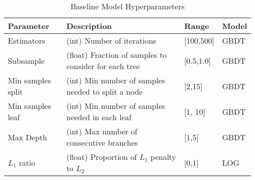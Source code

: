 \documentclass[11pt]{article}
\begin{document}
            \begin{table*}[ht]
            \caption{Baseline Model Hyperparameters} \label{tab:Baseline Model Hyperparameters} 
            \centering
            \begin{tabular}{|| m{3cm} | m{8.75cm}| m{2cm} | m{1.25cm} |}
                \hline
                \textbf{Parameter} & \textbf{Description} & \textbf{Range} & \textbf{Model} \\
                \hline\hline
                Estimators & (int) Number of iterations  & [100,500] & GBDT \\
                \hline
                Subsample & (float) Fraction of samples to consider for each tree & [0.5,1.0] & GBDT \\
                \hline
                Min samples split & (int) Min number of samples needed to split a node & [2,15] & GBDT \\
                \hline
                Min samples leaf & (int) Min number of samples needed in each leaf & [1, 10] & GBDT \\
                \hline
                Max Depth & (int) Max number of consecutive branches & [1,5] & GBDT \\
                \hline
                $L_1$ ratio & (float) Proportion of $L_1$ penalty to $L_2$ & [0,1] & LOG \\
                \hline
            \end{tabular}
            \end{table*}
\end{document}
